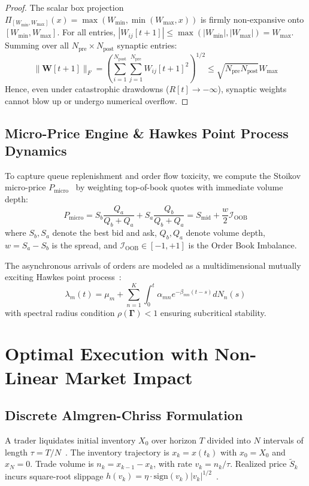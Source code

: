 \documentclass[journal,twocolumn,10pt]{article}
\begin{document}
\begin{proof}
The scalar box projection $\Pi_{[W_{\min}, W_{\max}]}(x) = \max(W_{\min}, \min(W_{\max}, x))$ is firmly non-expansive onto $[W_{\min}, W_{\max}]$. For all entries, $|W_{i j}[t+1]| \le \max(|W_{\min}|, |W_{\max}|) = W_{\max}$. Summing over all $N_{\text{pre}} \times N_{\text{post}}$ synaptic entries:
\begin{equation*}
\|\mathbf{W}[t+1]\|_F = \left( \sum_{i=1}^{N_{\text{post}}} \sum_{j=1}^{N_{\text{pre}}} W_{i j}[t+1]^2 \right)^{1/2} \le \sqrt{N_{\text{pre}} N_{\text{post}}} W_{\max}
\end{equation*}
Hence, even under catastrophic drawdowns ($R[t] \to -\infty$), synaptic weights cannot blow up or undergo numerical overflow.
\end{proof}

\subsection{Micro-Price Engine \& Hawkes Point Process Dynamics}
To capture queue replenishment and order flow toxicity, we compute the Stoikov micro-price $P_{\text{micro}}$~\cite{cont2010stochastic} by weighting top-of-book quotes with immediate volume depth:
\begin{equation}
\label{eq:microprice}
P_{\text{micro}} = S_b \frac{Q_a}{Q_b + Q_a} + S_a \frac{Q_b}{Q_b + Q_a} = S_{\text{mid}} + \frac{w}{2} \mathcal{I}_{\text{OOB}}
\end{equation}
where $S_b, S_a$ denote the best bid and ask, $Q_b, Q_a$ denote volume depth, $w = S_a - S_b$ is the spread, and $\mathcal{I}_{\text{OOB}} \in [-1, +1]$ is the Order Book Imbalance.

The asynchronous arrivals of orders are modeled as a multidimensional mutually exciting Hawkes point process~\cite{cartea2015algorithmic}:
\begin{equation}
\label{eq:hawkes}
\lambda_m(t) = \mu_m + \sum_{n=1}^K \int_0^t \alpha_{m n} e^{-\beta_{m n} (t - s)} d N_n(s)
\end{equation}
with spectral radius condition $\rho(\mathbf{\Gamma}) < 1$ ensuring subcritical stability.

\section{Optimal Execution with Non-Linear Market Impact}

\subsection{Discrete Almgren-Chriss Formulation}
A trader liquidates initial inventory $X_0$ over horizon $T$ divided into $N$ intervals of length $\tau = T / N$~\cite{almgren2000optimal}. The inventory trajectory is $x_k = x(t_k)$ with $x_0 = X_0$ and $x_N = 0$. Trade volume is $n_k = x_{k-1} - x_k$, with rate $v_k = n_k / \tau$. Realized price $\tilde{S}_k$ incurs square-root slippage $h(v_k) = \eta \cdot \text{sign}(v_k) |v_k|^{1/2}$~\cite{bouchaud2004fluctuations}.
\end{document}
